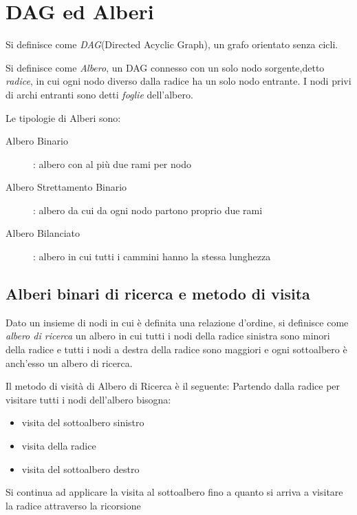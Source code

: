 \section{DAG ed Alberi}
Si definisce come \emph{DAG}(Directed Acyclic Graph), un grafo orientato senza cicli.

Si definisce come \emph{Albero}, un DAG connesso con un solo nodo sorgente,detto \emph{radice},
in cui ogni nodo diverso dalla radice ha un solo nodo entrante.\newline
I nodi privi di archi entranti sono detti \emph{foglie} dell'albero.


Le tipologie di Alberi sono:
\begin{description}
    \item[Albero Binario]: albero con al più due rami per nodo 
    \item[Albero Strettamento Binario]: albero da cui da ogni nodo partono proprio due rami 
    \item[Albero Bilanciato]: albero in cui tutti i cammini hanno la stessa lunghezza
\end{description}


\subsection{Alberi binari di ricerca e metodo di visita}
Dato un insieme di nodi in cui è definita una relazione d'ordine, si definisce come
\emph{albero di ricerca} un albero in cui tutti i nodi della radice sinistra sono
minori della radice e tutti i nodi a destra della radice sono maggiori e ogni sottoalbero
è anch'esso un albero di ricerca.


Il metodo di visità di Albero di Ricerca è il seguente:\newline
Partendo dalla radice per visitare tutti i nodi dell'albero bisogna:
\begin{itemize}
    \item visita del sottoalbero sinistro
    \item visita della radice
    \item visita del sottoalbero destro
\end{itemize}
Si continua ad applicare la visita al sottoalbero fino a quanto si arriva a visitare la radice
attraverso la ricorsione

